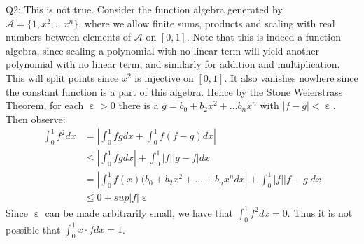\documentclass[letterpaper]{article}
\DeclareMathOperator{\ep}{\varepsilon}
\begin{document}
\noindent Q2: This is not true. Consider the function algebra generated by $\mathcal{A} = \{1,x^2, \dots x^n\}$, where we allow finite sums, products and scaling with real numbers between elements of $\mathcal{A}$ on $[0,1]$. Note that this is indeed a function algebra, since scaling a polynomial with no linear term will yield another polynomial with no linear term, and similarly for addition and multiplication. 
This will split points since $x^2$ is injective on $[0,1]$. It also vanishes nowhere since the constant function is a part of this algebra. Hence by the Stone Weierstrass Theorem, for each $\ep>0$ there is a $g= b_0 + b_2x^2 + \dots b_nx^n$ with $|f-g|<\ep$. 
Then observe: 
\begin{align*}
    \int_{0}^1 f^2 dx &= |\int_0^1 fg dx + \int_0^1 f(f-g)dx|
    \\ & \leq |\int_0^1fg dx| +\int_{0}^1 |f||g-f|dx
    \\ & = |\int_0^1 f(x)(b_0 + b_2x^2 + \dots + b_n x^n dx| + \int_{0}^1 |f||f-g| dx
    \\ & \leq 0 + sup|f|\ep
\end{align*} Since $\ep$ can be made arbitrarily small, we have that $\int_0^1f^2 dx=0$. Thus it is not possible that $\int_0^1 x\cdot f dx =1$. 
\end{document}
